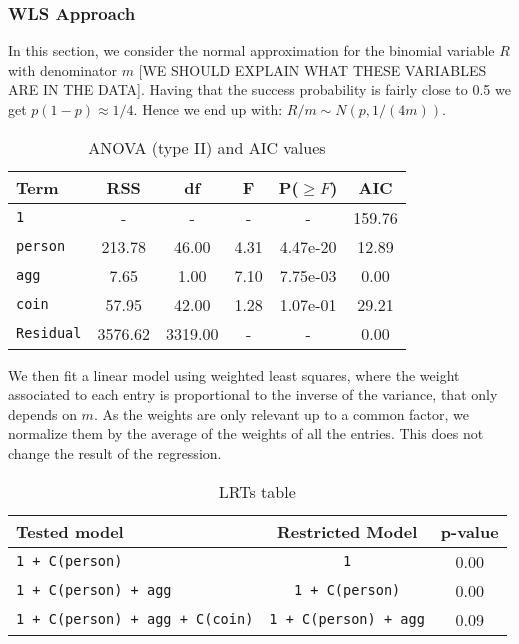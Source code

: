 \documentclass[a4paper, 12pt,oneside]{article}
\begin{document}
			\subsubsection{WLS Approach}
			In this section, we consider the normal approximation for the binomial variable $R$ with denominator $m$ [WE SHOULD EXPLAIN WHAT THESE VARIABLES ARE IN THE DATA]. 
			Having that the success probability is fairly close to 0.5 we get $p(1-p)\approx1/4$. Hence we end up with: $R/m \sim N(p,1/(4m))$. 
			\begin{table}[htb]
				\centering
				\caption{ANOVA (type II) and AIC values}
				\label{tab:WLS_AIC}
				\begin{tabular}{lccccc}
				\toprule
				Term & RSS & df & F & P($\ge F$) & AIC \\
				\midrule
				\texttt{1} & - & - & - & - & 159.76  \\
				\texttt{person} & 213.78 & 46.00 & 4.31 & 4.47e-20 & 12.89 \\
				\texttt{agg} & 7.65 & 1.00 & 7.10 & 7.75e-03 & 0.00 \\
				\texttt{coin} & 57.95 & 42.00 & 1.28 & 1.07e-01 & 29.21 \\
				\texttt{Residual} & 3576.62 & 3319.00 & - & - & 0.00 \\
				\bottomrule
				\end{tabular}
			\end{table}
			
			We then fit a linear model using weighted least squares, where the  weight associated to each entry is proportional to the inverse of the variance, that only depends on $m$. As the weights are only relevant up to a common factor, we normalize them by the average of the weights of all the entries. This does not change the result of the regression. 
			\begin{table}[htb]
				\centering
				\caption{LRTs table}
				\label{tab:WLS_LRT}
				\begin{tabular}{lcc}
				\toprule
				Tested model & Restricted Model & p-value \\
				\midrule
				\texttt{1 + C(person)} & \texttt{1} & 0.00 \\
				\texttt{1 + C(person) + agg} & \texttt{1 + C(person)} & 0.00 \\
				\texttt{1 + C(person) + agg + C(coin)} & \texttt{1 + C(person) + agg} & 0.09 \\
				\bottomrule
				\end{tabular}
			\end{table}
			
\end{document}
